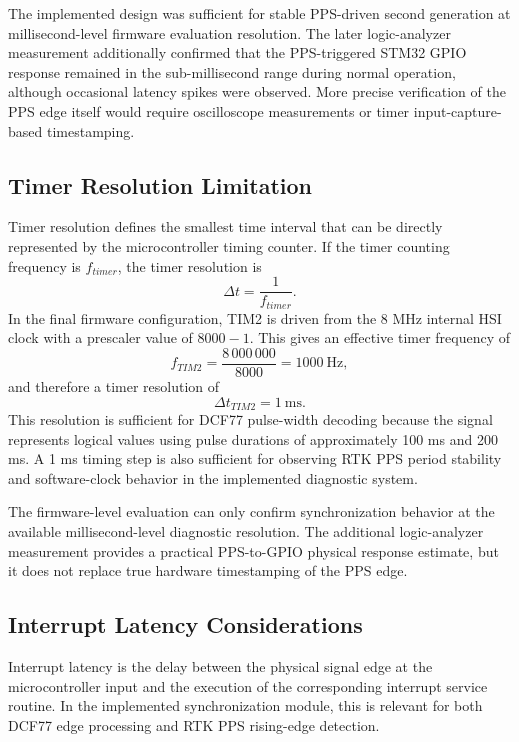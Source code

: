 The implemented design was sufficient for stable PPS-driven second generation at millisecond-level firmware evaluation resolution. The later logic-analyzer measurement additionally confirmed that the PPS-triggered STM32 GPIO response remained in the sub-millisecond range during normal operation, although occasional latency spikes were observed. More precise verification of the PPS edge itself would require oscilloscope measurements or timer input-capture-based timestamping.

\subsection{Timer Resolution Limitation}

Timer resolution defines the smallest time interval that can be directly represented by the microcontroller timing counter. If the timer counting frequency is $f_{timer}$, the timer resolution is
\begin{equation}
\Delta t = \frac{1}{f_{timer}}.
\end{equation}
In the final firmware configuration, TIM2 is driven from the 8 MHz internal HSI clock with a prescaler value of $8000 - 1$. This gives an effective timer frequency of
\begin{equation}
f_{TIM2} = \frac{8\,000\,000}{8000} = 1000~\mathrm{Hz},
\end{equation}
and therefore a timer resolution of
\begin{equation}
\Delta t_{TIM2} = 1~\mathrm{ms}.
\end{equation}
This resolution is sufficient for DCF77 pulse-width decoding because the signal represents logical values using pulse durations of approximately 100 ms and 200 ms. A 1 ms timing step is also sufficient for observing RTK PPS period stability and software-clock behavior in the implemented diagnostic system.

The firmware-level evaluation can only confirm synchronization behavior at the available millisecond-level diagnostic resolution. The additional logic-analyzer measurement provides a practical PPS-to-GPIO physical response estimate, but it does not replace true hardware timestamping of the PPS edge.

\subsection{Interrupt Latency Considerations}

Interrupt latency is the delay between the physical signal edge at the microcontroller input and the execution of the corresponding interrupt service routine. In the implemented synchronization module, this is relevant for both DCF77 edge processing and RTK PPS rising-edge detection.

